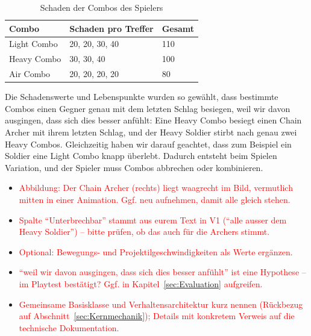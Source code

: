 \documentclass[../Main.tex]{subfiles}
\begin{document}
\begin{table}[H]
    \centering
    \small
    \renewcommand{\arraystretch}{1.3}
    \begin{tabular}{|l|l|l|}
        \hline
        \textbf{Combo} & \textbf{Schaden pro Treffer} & \textbf{Gesamt} \\
        \hline
        Light Combo & 20, 20, 30, 40 & 110 \\
        \hline
        Heavy Combo & 30, 30, 40 & 100 \\
        \hline
        Air Combo & 20, 20, 20, 20 & 80 \\
        \hline
    \end{tabular}
    \caption{Schaden der Combos des Spielers}
    \label{tab:Combos}
\end{table}

Die Schadenswerte und Lebenspunkte wurden so gewählt, dass bestimmte Combos einen Gegner genau mit dem letzten Schlag besiegen, weil wir davon ausgingen, dass sich dies besser anfühlt: Eine Heavy Combo besiegt einen Chain Archer mit ihrem letzten Schlag, und der Heavy Soldier stirbt nach genau zwei Heavy Combos. Gleichzeitig haben wir darauf geachtet, dass zum Beispiel ein Soldier eine Light Combo knapp überlebt. Dadurch entsteht beim Spielen Variation, und der Spieler muss Combos abbrechen oder kombinieren.

\begin{itemize}[leftmargin=1.5cm]
    \item \textcolor{red}{Abbildung: Der Chain Archer (rechts) liegt waagrecht im Bild, vermutlich mitten in einer Animation. Ggf. neu aufnehmen, damit alle gleich stehen.}
    \item \textcolor{red}{Spalte \enquote{Unterbrechbar} stammt aus eurem Text in V1 (\enquote{alle ausser dem Heavy Soldier}) -- bitte prüfen, ob das auch für die Archers stimmt.}
    \item \textcolor{red}{Optional: Bewegungs- und Projektilgeschwindigkeiten als Werte ergänzen.}
    \item \textcolor{red}{\enquote{weil wir davon ausgingen, dass sich dies besser anfühlt} ist eine Hypothese -- im Playtest bestätigt? Ggf. in Kapitel~\ref{sec:Evaluation} aufgreifen.}
    \item \textcolor{red}{Gemeinsame Basisklasse und Verhaltensarchitektur kurz nennen (Rückbezug auf Abschnitt~\ref{sec:Kernmechanik}); Details mit konkretem Verweis auf die technische Dokumentation.}
\end{itemize}
\end{document}
